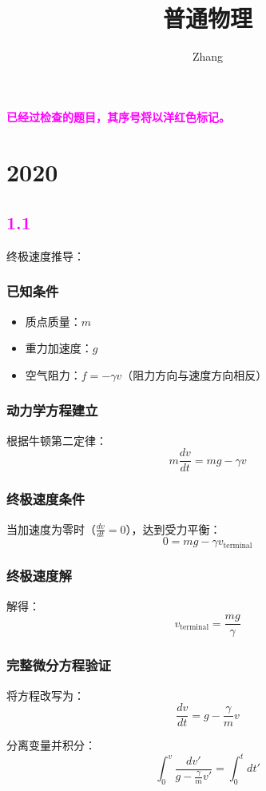 \documentclass{article}
\title{普通物理}
\author{Zhang}
\begin{document}
\maketitle
\textcolor{magenta}{\textbf{已经过检查的题目，其序号将以洋红色标记。}}
\section*{2020}

\subsection*{\textcolor{magenta}{1.1}}

终极速度推导：
\subsubsection*{已知条件}
\begin{itemize}
  \item 质点质量：\( m \)
  \item 重力加速度：\( g \)
  \item 空气阻力：\( f = -\gamma v \)（阻力方向与速度方向相反）
\end{itemize}

\subsubsection*{动力学方程建立}
根据牛顿第二定律：
\[
m\frac{dv}{dt} = mg - \gamma v
\]

\subsubsection*{终极速度条件}
当加速度为零时（\( \frac{dv}{dt} = 0 \)），达到受力平衡：
\[
0 = mg - \gamma v_{\text{terminal}}
\]

\subsubsection*{终极速度解}
解得：
\[
v_{\text{terminal}} = \frac{mg}{\gamma}
\]

\subsubsection*{完整微分方程验证}
将方程改写为：
\[
\frac{dv}{dt} = g - \frac{\gamma}{m}v
\]

分离变量并积分：
\[
\int_0^{v}\frac{dv'}{g - \frac{\gamma}{m}v'} = \int_0^{t}dt'
\]
\end{document}

